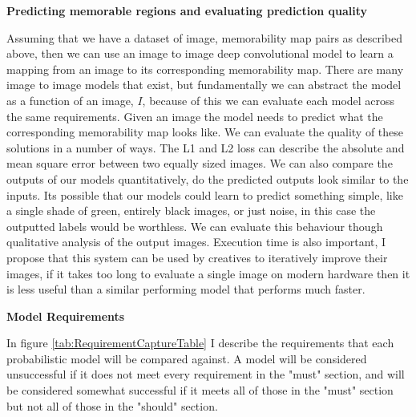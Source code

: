 \documentclass{UoYCSproject}
\begin{document}
\textbf{Predicting memorable regions and evaluating prediction quality}

Assuming that we have a dataset of image, memorability map pairs as described above, then we can use an image to image deep convolutional model to learn a mapping from an image to its corresponding memorability map. 
There are many image to image models that exist, but fundamentally we can abstract the model as a function of an image, $I$, because of this we can evaluate each model across the same requirements. 
Given an image the model needs to predict what the corresponding memorability map looks like.
We can evaluate the quality of these solutions in a number of ways. The L1 and L2 loss can describe the absolute and mean square error between two equally sized images. We can also compare the outputs of our models quantitatively, do the predicted outputs look similar to the inputs. Its possible that our models could learn to predict something simple, like a single shade of green, entirely black images, or just noise, in this case the outputted labels would be worthless. We can evaluate this behaviour though qualitative analysis of the output images. Execution time is also important, I propose that this system can be used by creatives to iteratively improve their images, if it takes too long to evaluate a single image on modern hardware then it is less useful than a similar performing model that performs much faster.

\textbf{Model Requirements}

In figure \ref{tab:RequirementCaptureTable} I describe the requirements that each probabilistic model will be compared against. A model will be considered unsuccessful if it does not meet every requirement in the "must" section, and will be considered somewhat successful if it meets all of those in the "must" section but not all of those in the "should" section.
\end{document}
